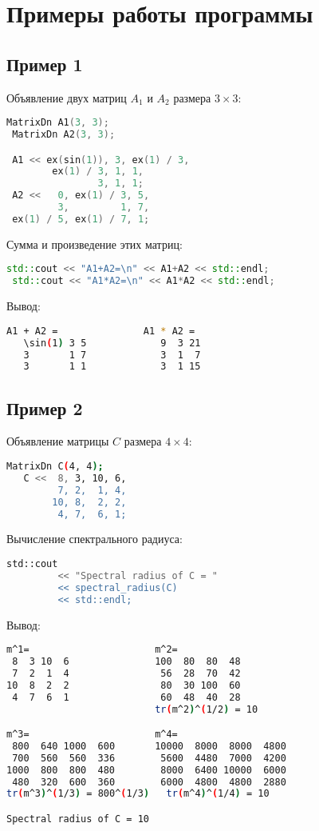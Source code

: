 \documentclass[specialist,
  substylefile = spbu.rtx,
  href,
  colorlinks=true,
  12pt]{disser}
\begin{document}
\printbibliography

\appendix
\cleardoublepage\makeatletter\@openrightfalse\makeatother
\chapter{Примеры работы программы}
\section{Пример 1}
Объявление двух матриц $A_{1}$ и $A_{2}$ размера $3\times 3$:
  \begin{lstlisting}[language=C++,basicstyle=\ttfamily,keywordstyle=\color{red}]
 MatrixDn A1(3, 3);
 MatrixDn A2(3, 3);

 A1 << ex(sin(1)), 3, ex(1) / 3,
        ex(1) / 3, 1, 1,
                3, 1, 1;
 A2 <<   0, ex(1) / 3, 5,
         3,         1, 7,
 ex(1) / 5, ex(1) / 7, 1;
  \end{lstlisting}
  Сумма и произведение этих матриц:
  \begin{lstlisting}[language=C++,basicstyle=\ttfamily,keywordstyle=\color{red}]
 std::cout << "A1+A2=\n" << A1+A2 << std::endl;
 std::cout << "A1*A2=\n" << A1*A2 << std::endl;
  \end{lstlisting}
  Вывод:
  \begin{lstlisting}[language=bash,basicstyle=\ttfamily,keywordstyle=\color{red}]
 A1 + A2 =               A1 * A2 =
   \sin(1) 3 5             9  3 21
   3       1 7             3  1  7
   3       1 1             3  1 15
  \end{lstlisting}
\section{Пример 2}
Объявление матрицы $C$ размера $4\times 4$:
  \begin{lstlisting}[language=bash,basicstyle=\ttfamily,keywordstyle=\color{red}]
   MatrixDn C(4, 4);
   C <<  8, 3, 10, 6,
         7, 2,  1, 4,
        10, 8,  2, 2,
         4, 7,  6, 1;
  \end{lstlisting}
  Вычисление спектрального радиуса:
  \begin{lstlisting}[language=bash,basicstyle=\ttfamily,keywordstyle=\color{red}]
   std::cout
         << "Spectral radius of C = "
         << spectral_radius(C)
         << std::endl;
   \end{lstlisting}
Вывод:
  \begin{lstlisting}[language=bash,basicstyle=\ttfamily,keywordstyle=\color{red}]
m^1=                      m^2=
 8  3 10  6               100  80  80  48
 7  2  1  4                56  28  70  42
10  8  2  2                80  30 100  60
 4  7  6  1                60  48  40  28
                          tr(m^2)^(1/2) = 10

m^3=                      m^4=
 800  640 1000  600       10000  8000  8000  4800
 700  560  560  336        5600  4480  7000  4200
1000  800  800  480        8000  6400 10000  6000
 480  320  600  360        6000  4800  4800  2880
tr(m^3)^(1/3) = 800^(1/3)   tr(m^4)^(1/4) = 10

Spectral radius of C = 10
\end{lstlisting}
\end{document}
